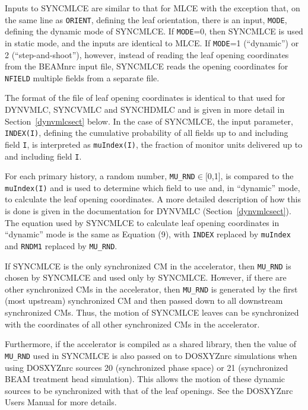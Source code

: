 \documentclass[12pt,twoside]{article}
\begin{document}
Inputs to SYNCMLCE are similar to that for MLCE with the exception that,
on the same line as {\tt ORIENT}, defining the leaf orientation, there is
an input, {\tt MODE}, defining the dynamic mode of SYNCMLCE.  If
{\tt MODE}=0, then SYNCMLCE is used in static mode, and the inputs
are identical to MLCE.  If {\tt MODE}=1 (``dynamic'') or 2 (``step-and-shoot''), however,
instead of reading the leaf opening coordinates from the BEAMnrc input file, SYNCMLCE reads
the opening coordinates for {\tt NFIELD} multiple fields from a separate file.

The format of the file of leaf opening coordinates is identical to that
used for DYNVMLC, SYNCVMLC and SYNCHDMLC and is given in more detail in
Section~\ref{dynvmlcsect} below.  In the case of SYNCMLCE, the input parameter, {\tt INDEX(I)}, defining
the cumulative probability of all fields up to and including field {\tt I}, is interpreted as {\tt muIndex(I)},
the fraction of monitor units delivered up to and including field {\tt I}.

For each primary history, a random number, {\tt MU\_RND}$\in[$0,1$]$, is compared to the
{\tt muIndex(I)} and is used to determine which field to use and, in ``dynamic'' mode, to calculate
the leaf opening coordinates.  A more detailed description of how this is done is given
in the documentation for DYNVMLC (Section~\ref{dynvmlcsect}). The equation used by SYNCMLCE to calculate
leaf opening coordinates in ``dynamic'' mode is the same as Equation (9), with {\tt INDEX} replaced
by {\tt muIndex} and {\tt RNDM1} replaced by {\tt MU\_RND}.

If SYNCMLCE is the only synchronized
CM in the accelerator, then {\tt MU\_RND} is chosen by SYNCMLCE and used only by SYNCMLCE.  However,
if there are other synchronized CMs in the accelerator, then {\tt MU\_RND} is generated by the
first (most upstream) synchronized CM and then passed down to all downstream synchronized CMs.  Thus,
the motion of SYNCMLCE leaves can be synchronized with the coordinates of all other synchronized CMs in
the accelerator.

Furthermore, if the accelerator is compiled as a shared library, then the value of {\tt MU\_RND} used
in SYNCMLCE is also passed on to DOSXYZnrc simulations
when using DOSXYZnrc sources 20 (synchronized phase space) or 21 (synchronized BEAM treatment head simulation).  This
allows the motion of these dynamic sources to be synchronized with that of the leaf openings.  See the
DOSXYZnrc Users Manual\cite{Wa05} for more details.
\end{document}
